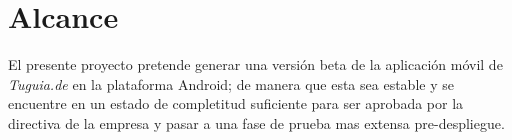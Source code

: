 \section{Alcance} \label{sect:alcance}

El presente proyecto pretende generar una versión beta de la aplicación móvil de \textit{Tuguia.de} en la plataforma Android; de manera que esta sea estable y se encuentre en un estado de completitud suficiente para ser aprobada por la directiva de la empresa y pasar a una fase de prueba mas extensa pre-despliegue. 